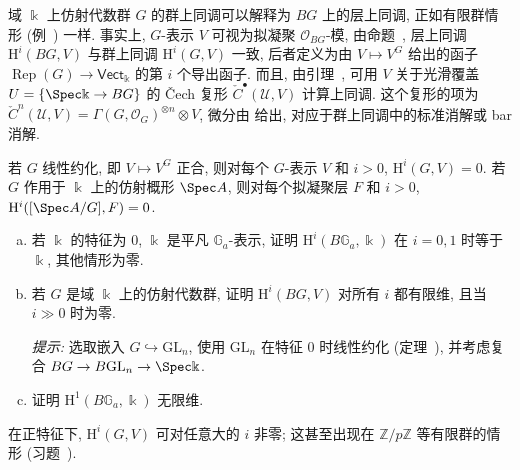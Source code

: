 \begin{example}[群上同调]\label{src:7.1.32}
域 $\Bbbk$ 上仿射代数群 $G$ 的群上同调可以解释为 $BG$ 上的层上同调, 正如有限群情形 (例~) 一样. 事实上, $G$-表示 $V$ 可视为拟凝聚 $\mathcal O_{BG}$-模, 由命题~, 层上同调 $\mathrm H^i(BG,V)$ 与群上同调 $\mathrm H^i(G,V)$ 一致, 后者定义为由 $V\mapsto V^G$ 给出的函子 $\operatorname{Rep}(G)\to\mathsf{Vect}_{\Bbbk}$ 的第 $i$ 个导出函子. 而且, 由引理~, 可用 $V$ 关于光滑覆盖 $\mathcal U=\{\Spec\Bbbk\to BG\}$ 的 Čech 复形 $\check C^{\bullet}(\mathcal U,V)$ 计算上同调. 这个复形的项为 $\check C^n(\mathcal U,V)=\Gamma(G,\mathcal O_G)^{\otimes n}\otimes V$, 微分由  给出, 对应于群上同调中的标准消解或 bar 消解.

若 $G$ 线性约化, 即 $V\mapsto V^G$ 正合, 则对每个 $G$-表示 $V$ 和 $i>0$, $\mathrm H^i(G,V)=0$. 若 $G$ 作用于 $\Bbbk$ 上的仿射概形 $\Spec A$, 则对每个拟凝聚层 $F$ 和 $i>0$, $\mathrm H^i([\Spec A/G],F)=0$.
\end{example}
\begin{exercise}\label{src:7.1.33}
\begin{enumerate}[(a)]
\item 若 $\Bbbk$ 的特征为 $0$, $\Bbbk$ 是平凡 $\mathbb G_a$-表示, 证明 $\mathrm H^i(B\mathbb G_a,\Bbbk)$ 在 $i=0,1$ 时等于 $\Bbbk$, 其他情形为零.
\item 若 $G$ 是域 $\Bbbk$ 上的仿射代数群, 证明 $\mathrm H^i(BG,V)$ 对所有 $i$ 都有限维, 且当 $i\gg0$ 时为零.

\textit{提示:} 选取嵌入 $G\hookrightarrow\mathrm{GL}_n$, 使用 $\mathrm{GL}_n$ 在特征 $0$ 时线性约化 (定理~), 并考虑复合 $BG\to B\mathrm{GL}_n\to\Spec\Bbbk$.
\item 证明 $\mathrm H^1(B\mathbb G_a,\Bbbk)$ 无限维.
\end{enumerate}
\end{exercise}
在正特征下, $\mathrm H^i(G,V)$ 可对任意大的 $i$ 非零; 这甚至出现在 $\mathbb Z/p\mathbb Z$ 等有限群的情形 (习题~).
